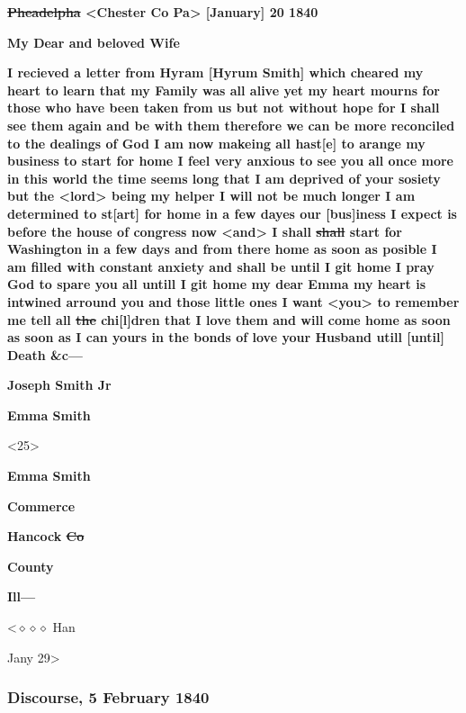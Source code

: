 				\textbf{\sout{Pheadelpha} <Chester Co Pa> [January] 20 1840}

				\textbf{My Dear and beloved Wife}

				\textbf{I recieved a letter from Hyram [Hyrum Smith] which cheared my heart to learn that my Family was all alive yet my heart mourns for those who have been taken from us but not without hope for I shall see them again and be with them therefore we can be more reconciled to the dealings of God I am now makeing all hast[e] to arange my business to start for home I feel very anxious to see you all once more in this world the time seems long that I am deprived of your sosiety but the <lord> being my helper I will not be much longer I am determined to st[art] for home in a few dayes our [bus]iness I expect is before the house of congress now <and> I shall \sout{shall} start for Washington in a few days and from there home as soon as posible I am filled with constant anxiety and shall be until I git home I pray God to spare you all untill I git home my dear Emma my heart is intwined arround you and those little ones I want <you> to remember me tell all \sout{the} chi[l]dren that I love them and will come home as soon as soon as I can yours in the bonds of love your Husband utill [until] Death \&c---}

				\begin{tightcenter}
					\textbf{Joseph Smith Jr}
				\end{tightcenter}

				\textbf{Emma Smith}

				\medskip

				\begin{tightright}
					<25>
				\end{tightright}

				\textbf{Emma Smith}

				\textbf{Commerce}

				\textbf{Hancock \sout{Co}}

				\textbf{County}

				\textbf{Ill---}

				<$\diamond\diamond\diamond$ Han

				Jany 29>
				
		\subsubsection{Discourse, 5 February 1840}
			\label{EMS-1840-JS-5-FEB-1840}
			
